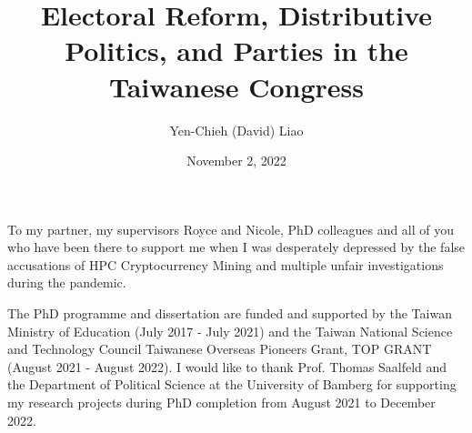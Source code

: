 \documentclass[12pt,leqno]{report}
\begin{document}
\sloppy
\title{Electoral Reform, Distributive Politics, 
            and Parties in the Taiwanese Congress} 
\author{Yen-Chieh (David) Liao}

\date{November 2, 2022}

\maketitle

\thispagestyle{plain}
\newenvironment{dedication}
{\cleardoublepage {}
  \begin{center} \em}
  {\end{center} \vspace*{\stretch{3}} }
\begin{dedication}

To my partner, my supervisors Royce and Nicole, PhD colleagues and all of you who have been there to support me when I was desperately depressed by the false accusations of HPC Cryptocurrency Mining and multiple unfair investigations during the pandemic.

\end{dedication}

\begin{acknowledgments}
The PhD programme and dissertation are funded and supported by the Taiwan Ministry of Education (July 2017 - July 2021) and the Taiwan National Science and Technology Council Taiwanese Overseas Pioneers Grant, TOP GRANT (August 2021 - August 2022). I would like to thank Prof. Thomas Saalfeld and the Department of Political Science at the University of Bamberg for supporting my research projects during  PhD completion from August 2021 to December 2022.
\end{acknowledgments}

\tableofcontents

\listoftables

\listoffigures

\begin{abstract}

\end{abstract}
\end{document}
